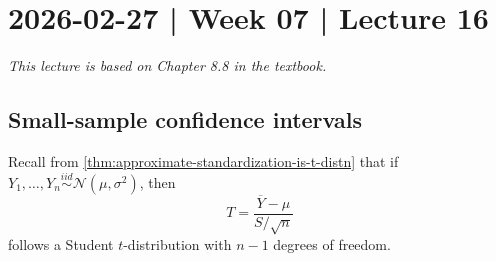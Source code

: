 \documentclass[10pt]{article}
\theoremstyle{definition}
\newcommand{\1}[1]{\textbf{1}_{\left[#1\right]}} %
\begin{document}
\newpage
\section{2026-02-27 | Week 07 | Lecture 16}
\textit{This lecture is based on Chapter 8.8 in the textbook.}
\subsection{Small-sample confidence intervals}


Recall from \cref{thm:approximate-standardization-is-t-distn} that if
$Y_{1},\ldots,Y_{n}\overset{iid}{\sim}\mathcal{N}(\mu,\sigma^{2})$, then
\begin{equation*}
  T = \frac{\overline{Y}-\mu}{S/\sqrt{n}}
\end{equation*}
follows a Student $t$-distribution with $n-1$ degrees of freedom.
\end{document}
